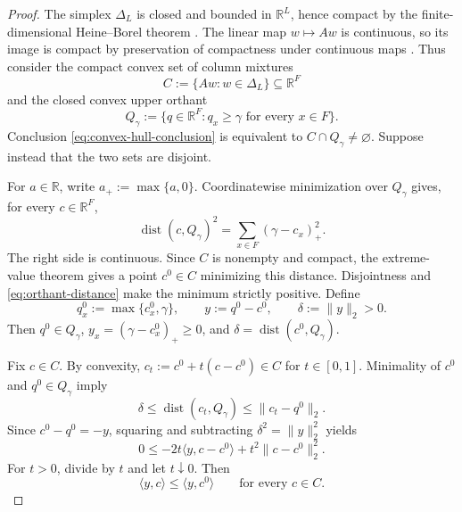 \begin{proof}
The simplex $\Delta_L$ is closed and bounded in $\mathbb R^L$, hence compact
by the finite-dimensional Heine--Borel theorem
\citep[Theorem~2.41]{rudin1976principles}.  The linear map $w\mapsto Aw$ is
continuous, so its image is compact by preservation of compactness under
continuous maps \citep[Theorem~4.14]{rudin1976principles}.  Thus consider the
compact convex set of column mixtures
\[
C:=\{Aw:w\in\Delta_L\}\subseteq\mathbb R^F
\]
and the closed convex upper orthant
\[
Q_\gamma:=\{q\in\mathbb R^F:q_x\ge\gamma
\text{ for every }x\in F\}.
\]
Conclusion \eqref{eq:convex-hull-conclusion} is equivalent to
$C\cap Q_\gamma\ne\varnothing$.  Suppose instead that the two sets are
disjoint.

For $a\in\mathbb R$, write $a_+:=\max\{a,0\}$.  Coordinatewise
minimization over $Q_\gamma$ gives, for every $c\in\mathbb R^F$,
\begin{equation}\label{eq:orthant-distance}
\operatorname{dist}(c,Q_\gamma)^2
=\sum_{x\in F}(\gamma-c_x)_+^2.
\end{equation}
The right side is continuous.  Since $C$ is nonempty and compact, the
extreme-value theorem \citep[Theorem~4.16]{rudin1976principles} gives a point
$c^0\in C$ minimizing this distance.  Disjointness and
\eqref{eq:orthant-distance} make the minimum strictly positive.  Define
\begin{equation}\label{eq:closest-point-objects}
q_x^0:=\max\{c_x^0,\gamma\},\qquad
y:=q^0-c^0,\qquad
\delta:=\lVert y\rVert_2>0.
\end{equation}
Then $q^0\in Q_\gamma$,
$y_x=(\gamma-c_x^0)_+\ge0$, and
$\delta=\operatorname{dist}(c^0,Q_\gamma)$.

Fix $c\in C$.  By convexity,
$c_t:=c^0+t(c-c^0)\in C$ for $t\in[0,1]$.  Minimality of $c^0$ and
$q^0\in Q_\gamma$ imply
\[
\delta\le\operatorname{dist}(c_t,Q_\gamma)
\le\lVert c_t-q^0\rVert_2.
\]
Since $c^0-q^0=-y$, squaring and subtracting
$\delta^2=\lVert y\rVert_2^2$ yields
\[
0\le-2t\langle y,c-c^0\rangle
+t^2\lVert c-c^0\rVert_2^2.
\]
For $t>0$, divide by $t$ and let $t\downarrow0$.  Then
\begin{equation}\label{eq:closest-point-support}
\langle y,c\rangle\le\langle y,c^0\rangle
\qquad\text{for every }c\in C.
\end{equation}


\end{proof}
